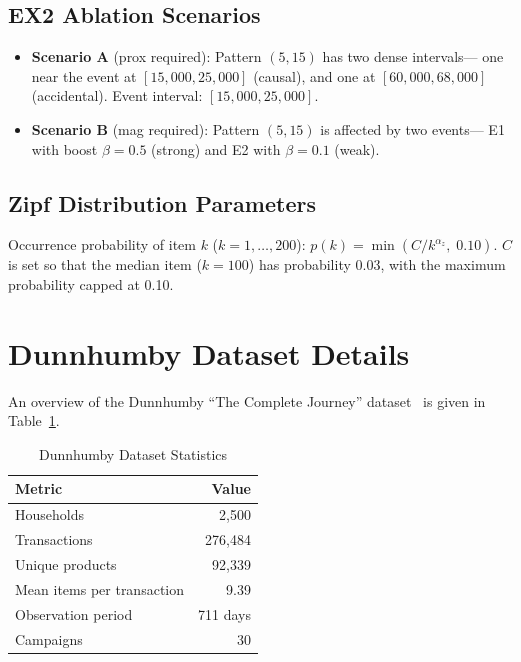 \subsection{EX2 Ablation Scenarios}

\begin{itemize}
\item \textbf{Scenario A} (prox required):
    Pattern $(5,15)$ has two dense intervals---
    one near the event at $[15{,}000,25{,}000]$ (causal),
    and one at $[60{,}000,68{,}000]$ (accidental).
    Event interval: $[15{,}000,25{,}000]$.
\item \textbf{Scenario B} (mag required):
    Pattern $(5,15)$ is affected by two events---
    E1 with boost $\beta = 0.5$ (strong) and E2 with $\beta = 0.1$ (weak).
\end{itemize}

\subsection{Zipf Distribution Parameters}

Occurrence probability of item $k$ ($k = 1, \ldots, 200$):
$p(k) = \min(C / k^{\alpha_z},\; 0.10)$.
$C$ is set so that the median item ($k=100$) has probability 0.03,
with the maximum probability capped at 0.10.

\section{Dunnhumby Dataset Details}\label{app:dunnhumby}

An overview of the Dunnhumby ``The Complete Journey'' dataset~\cite{dunnhumby2014complete}
is given in Table~\ref{tab:dunnhumby_stats}.

\begin{table}[t]
\caption{Dunnhumby Dataset Statistics}
\label{tab:dunnhumby_stats}
\centering
\begin{tabular}{lr}
\toprule
Metric & Value \\
\midrule
Households & 2{,}500 \\
Transactions & 276{,}484 \\
Unique products & 92{,}339 \\
Mean items per transaction & 9.39 \\
Observation period & 711 days \\
Campaigns & 30 \\
\bottomrule
\end{tabular}
\end{table}

